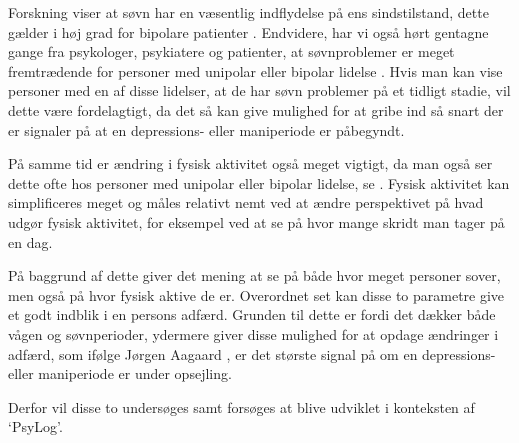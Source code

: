 Forskning viser at søvn har en væsentlig indflydelse på ens sindstilstand, dette gælder i høj grad for bipolare patienter \citep{CPSP:CPSP1164}.
Endvidere, har vi også hørt gentagne gange fra psykologer, psykiatere og patienter, at søvnproblemer er meget fremtrædende for personer med unipolar eller bipolar lidelse \citep[Kapitel 2, Sektion 3,4,5]{misc:faellesrapp}  .
Hvis man kan vise personer med en af disse lidelser, at de har søvn problemer på et tidligt stadie, vil dette være fordelagtigt, da det så kan give mulighed for at gribe ind så snart der er signaler på at en depressions- eller maniperiode er påbegyndt.

På samme tid er ændring i fysisk aktivitet også meget vigtigt, da man også ser dette ofte hos personer med unipolar eller bipolar lidelse, se \citep[Kapitel 1, Sektion 4]{misc:faellesrapp} . 
Fysisk aktivitet kan simplificeres meget og måles relativt nemt ved at ændre perspektivet på hvad udgør fysisk aktivitet, for eksempel ved at se på hvor mange skridt man tager på en dag.

På baggrund af dette giver det mening at se på både hvor meget personer sover, men også på hvor fysisk aktive de er.
Overordnet set kan disse to parametre give et godt indblik i en persons adfærd.
Grunden til dette er fordi det dækker både vågen og søvnperioder, ydermere giver disse mulighed for at opdage ændringer i adfærd, som ifølge Jørgen Aagaard \citep[Kapitel 1, Sektion 4]{misc:faellesrapp} , er det største signal på om en depressions- eller maniperiode er under opsejling. 

Derfor vil disse to undersøges samt forsøges at blive udviklet i konteksten af `PsyLog'.
